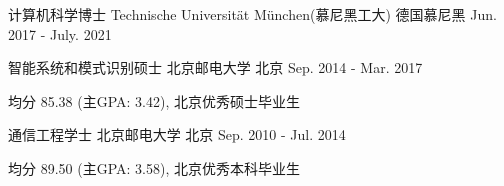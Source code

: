 



\begin{cventries}

\cventry
{计算机科学博士} %
{Technische Universität München(慕尼黑工大)} %
{德国慕尼黑} %
{Jun. 2017 - July. 2021} %
{ %
}


\cventry
{智能系统和模式识别硕士} %
{北京邮电大学} %
{北京} %
{Sep. 2014 - Mar. 2017} %
{ %
\begin{cvitems}
\item {均分 85.38 (主GPA: 3.42), 北京优秀硕士毕业生}
\end{cvitems}
}


\cventry
{通信工程学士} %
{北京邮电大学} %
{北京} %
{Sep. 2010 - Jul. 2014} %
{ %
\begin{cvitems}
\item {均分 89.50 (主GPA: 3.58), 北京优秀本科毕业生}
\end{cvitems}
}%

\end{cventries}
